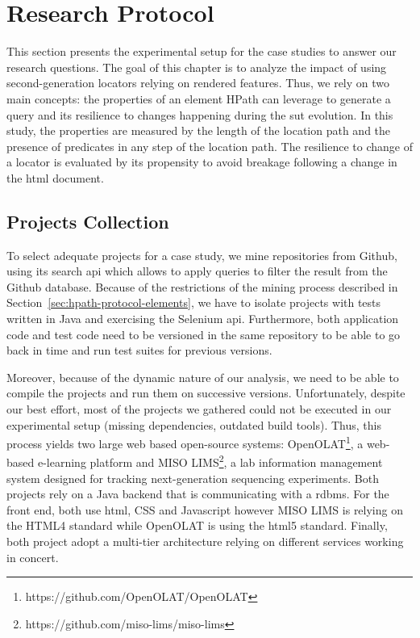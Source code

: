 \section{Research Protocol}
\label{sec:hpath-protocol}

This section presents the experimental setup for the case studies to answer our research questions. The goal of this chapter is to analyze the impact of using second-generation locators relying on rendered features. Thus, we rely on two main concepts: the properties of an element HPath can leverage to generate a query and its resilience to changes happening during the \gls{sut} evolution. In this study, the properties are measured by the length of the location path and the presence of predicates in any step of the location path. The resilience to change of a locator is evaluated by its propensity to avoid breakage following a change in the \gls{html} document.

\subsection{Projects Collection}
\label{sec:hpath-protocol-projects}

To select adequate projects for a case study, we mine repositories from Github, using its search \gls{api} which allows to apply queries to filter the result from the Github database. Because of the restrictions of the mining process described in Section~\ref{sec:hpath-protocol-elements}, we have to isolate projects with tests written in Java and exercising the Selenium \gls{api}. Furthermore, both application code and test code need to be versioned in the same repository to be able to go back in time and run test suites for previous versions.

Moreover, because of the dynamic nature of our analysis, we need to be able to compile the projects and run them on successive versions. Unfortunately, despite our best effort, most of the projects we gathered could not be executed in our experimental setup (missing dependencies, outdated build tools). Thus, this process yields two large web based open-source systems: OpenOLAT\footnote{https://github.com/OpenOLAT/OpenOLAT}, a web-based e-learning platform and MISO LIMS\footnote{https://github.com/miso-lims/miso-lims}, a lab information management system designed for tracking next-generation sequencing experiments. Both projects rely on a Java backend that is communicating with a \gls{rdbms}. For the front end, both use \gls{html}, CSS and Javascript however MISO LIMS is relying on the HTML4 standard while OpenOLAT is using the \gls{html}5 standard. Finally, both project adopt a multi-tier architecture relying on different services working in concert.

